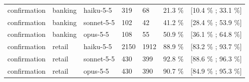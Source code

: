 \begin{table}[htbp]
{\begin{tabular}{lllllll}
confirmation & banking & haiku-5-5 & 319 & 68 & 21.3 \% & [10.4 \% ; 33.1 \%] \\
confirmation & banking & sonnet-5-5 & 102 & 42 & 41.2 \% & [28.4 \% ; 53.9 \%] \\
confirmation & banking & opus-5-5 & 108 & 55 & 50.9 \% & [36.1 \% ; 64.8 \%] \\
confirmation & retail & haiku-5-5 & 2150 & 1912 & 88.9 \% & [83.2 \% ; 93.7 \%] \\
confirmation & retail & sonnet-5-5 & 430 & 399 & 92.8 \% & [88.6 \% ; 96.3 \%] \\
confirmation & retail & opus-5-5 & 430 & 390 & 90.7 \% & [84.9 \% ; 95.3 \%] \\
\bottomrule
\end{tabular}}
\end{table}
